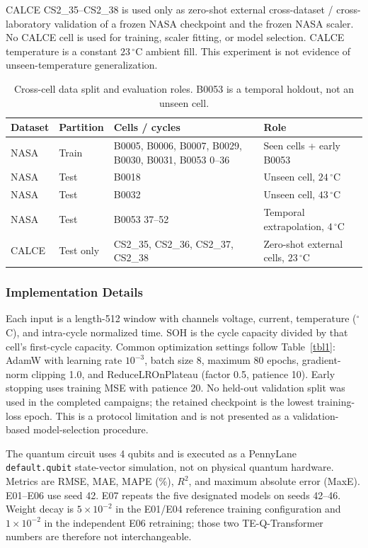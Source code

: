 CALCE CS2\_35--CS2\_38 is used only as zero-shot external cross-dataset / cross-laboratory validation of a frozen NASA checkpoint and the frozen NASA scaler. No CALCE cell is used for training, scaler fitting, or model selection. CALCE temperature is a constant $23\,^\circ$C ambient fill. This experiment is not evidence of unseen-temperature generalization.

\begin{table}[t]
\caption{Cross-cell data split and evaluation roles. B0053 is a temporal holdout, not an unseen cell.}\label{tab:exp_split}
\begin{tabular*}{\tblwidth}{@{}LLLL@{}}
\toprule
Dataset & Partition & Cells / cycles & Role \\
\midrule
NASA & Train & B0005, B0006, B0007, B0029, B0030, B0031, B0053 0--36 & Seen cells + early B0053 \\
NASA & Test & B0018 & Unseen cell, $24\,^\circ$C \\
NASA & Test & B0032 & Unseen cell, $43\,^\circ$C \\
NASA & Test & B0053 37--52 & Temporal extrapolation, $4\,^\circ$C \\
CALCE & Test only & CS2\_35, CS2\_36, CS2\_37, CS2\_38 & Zero-shot external cells, $23\,^\circ$C \\
\bottomrule
\end{tabular*}
\end{table}

\subsubsection{Implementation Details}
\label{sec:implementation_details}

Each input is a length-512 window with channels voltage, current, temperature ($^\circ$C), and intra-cycle normalized time. SOH is the cycle capacity divided by that cell's first-cycle capacity. Common optimization settings follow Table~\ref{tbl1}: AdamW with learning rate $10^{-3}$, batch size 8, maximum 80 epochs, gradient-norm clipping 1.0, and ReduceLROnPlateau (factor 0.5, patience 10). Early stopping uses training MSE with patience 20. No held-out validation split was used in the completed campaigns; the retained checkpoint is the lowest training-loss epoch. This is a protocol limitation and is not presented as a validation-based model-selection procedure.

The quantum circuit uses 4 qubits and is executed as a PennyLane \texttt{default.qubit} state-vector simulation, not on physical quantum hardware. Metrics are RMSE, MAE, MAPE (\%), $R^2$, and maximum absolute error (MaxE). E01--E06 use seed 42. E07 repeats the five designated models on seeds 42--46. Weight decay is $5\times10^{-2}$ in the E01/E04 reference training configuration and $1\times10^{-2}$ in the independent E06 retraining; those two TE-Q-Transformer numbers are therefore not interchangeable.

